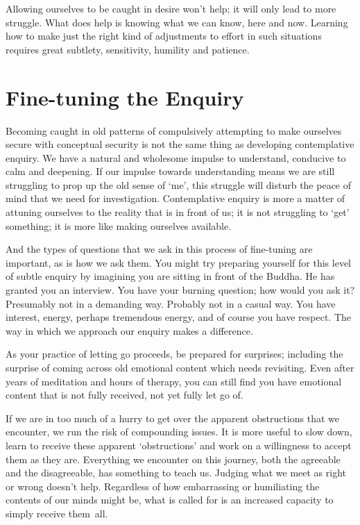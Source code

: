 Allowing ourselves to be caught in desire won’t help; it will only lead
to more struggle. What does help is knowing what we can know, here and
now. Learning how to make just the right kind of adjustments to effort
in such situations requires great subtlety, sensitivity, humility and
patience.

\section{Fine-tuning the Enquiry}

\enlargethispage*{\baselineskip}

Becoming caught in old patterns of compulsively attempting to make
ourselves secure with conceptual security is not the same thing as
developing contemplative enquiry. We have a natural and wholesome
impulse to understand, conducive to calm and deepening. If our impulse
towards understanding means we are still struggling to prop up the old
sense of ‘me’, this struggle will disturb the peace of mind that we need
for investigation. Contemplative enquiry is more a matter of attuning
ourselves to the reality that is in front of us; it is not struggling to
‘get’ something; it is more like making ourselves available.

And the types of questions that we ask in this process of fine-tuning
are important, as is how we ask them. You might try preparing yourself
for this level of subtle enquiry by imagining you are sitting in front
of the Buddha. He has granted you an interview. You have your burning
question; how would you ask it? Presumably not in a demanding way.
Probably not in a casual way. You have interest, energy, perhaps
tremendous energy, and of course you have respect. The way in which we
approach our enquiry makes a difference.

As your practice of letting go proceeds, be prepared for surprises;
including the surprise of coming across old emotional content which
needs revisiting. Even after years of meditation and hours of therapy,
you can still find you have emotional content that is not fully
received, not yet fully let go of.

If we are in too much of a hurry to get over the apparent obstructions
that we encounter, we run the risk of compounding issues. It is more
useful to slow down, learn to receive these apparent ‘obstructions’ and
work on a willingness to accept them as they are. Everything we
encounter on this journey, both the agreeable and the disagreeable, has
something to teach us. Judging what we meet as right or wrong doesn’t
help. Regardless of how embarrassing or humiliating the contents of our
minds might be, what is called for is an increased capacity to simply
receive them~all.

